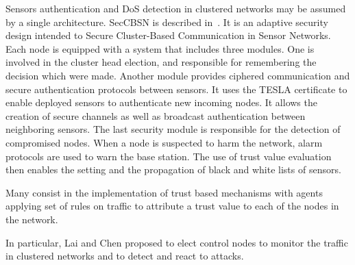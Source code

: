 

Sensors authentication and DoS detection in clustered networks may be assumed by a single architecture.
SecCBSN is described in~\cite{HHC07}.
It is an adaptive security design intended to Secure Cluster-Based Communication in Sensor Networks.
Each node is equipped with a system that includes three modules.
One is involved in the cluster head election, and responsible for remembering the decision which were made.
Another module provides ciphered communication and secure authentication protocols between sensors.
It uses the TESLA certificate to enable deployed sensors to authenticate new incoming nodes.
It allows the creation of secure channels as well as broadcast authentication between neighboring sensors.
The last security module is responsible for the detection of compromised nodes.
When a node is suspected to harm the network, alarm protocols are used to warn the base station.
The use of trust value evaluation then enables the setting and the propagation of black and white lists of sensors.


Many consist in the implementation of trust based mechanisms\cite{MC10,F-GRL07} with agents applying set of rules\cite{RKKK13} on traffic to attribute a trust value to each of the nodes in the network.

In particular, Lai and Chen\cite{LC08} proposed to elect control nodes to monitor the traffic in clustered networks and to detect and react to \dos attacks.

